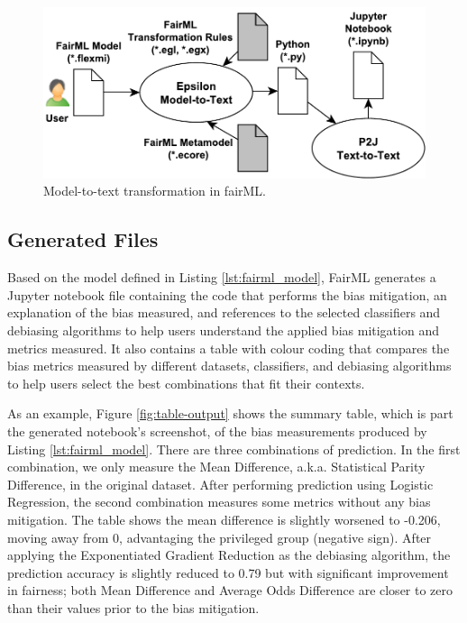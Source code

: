 \documentclass[sigconf,review]{acmart}
\begin{document}
{	\begin{figure}
		\includegraphics[width=\linewidth]{figures/transformation}
		\caption{Model-to-text transformation in fairML.}
		\label{fig:transformation}
	\end{figure}
	
	\subsection{Generated Files}
	\label{sec:generated_files}
	Based on the model defined in Listing \ref{lst:fairml_model}, FairML generates a Jupyter notebook file containing the code that performs the bias mitigation, an explanation of the bias measured, and references to the selected classifiers and debiasing algorithms to help users understand the applied bias mitigation and metrics measured. It also contains a table with colour coding that compares the bias metrics measured by different datasets, classifiers, and debiasing algorithms to help users select the best combinations that fit their contexts. 
	
	 As an example, Figure \ref{fig:table-output} shows the summary table, which is part the generated notebook's screenshot, of the bias measurements produced by Listing \ref{lst:fairml_model}. 
	There are three combinations of prediction. In the first combination, we only measure the Mean Difference, a.k.a. Statistical Parity Difference, in the original dataset. After performing prediction using Logistic Regression, the second combination measures some metrics without any bias mitigation. The table shows the mean difference is slightly worsened to -0.206, moving away from 0, advantaging the privileged group (negative sign). After applying the Exponentiated Gradient Reduction as the debiasing algorithm, the prediction accuracy is slightly reduced to 0.79 but with significant improvement in fairness; both Mean Difference and Average Odds Difference are closer to zero than their values prior to the bias mitigation.
		
}
\end{document}
